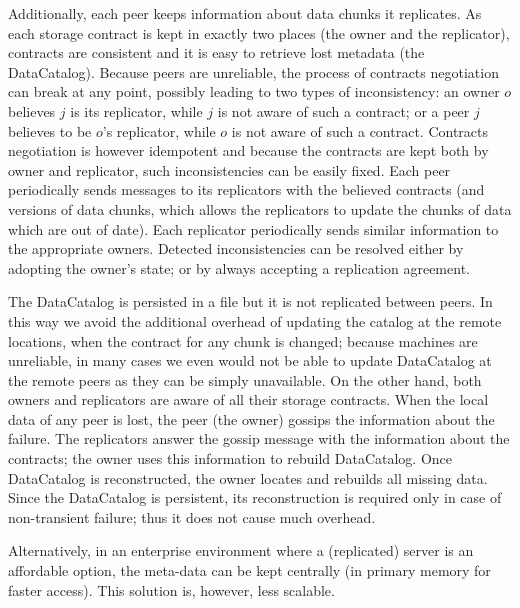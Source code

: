 \documentclass[10pt, final, conference, letterpaper]{IEEEtran}
\begin{document}
Additionally, each peer keeps information about data chunks it replicates. 
As each storage contract is kept in exactly two places (the owner and the replicator), contracts are consistent and it is easy to retrieve lost metadata (the DataCatalog). 
Because peers are unreliable, the process of contracts negotiation can break at any point, possibly leading to two types of inconsistency: an owner $o$ believes $j$ is its replicator, while $j$ is not aware of such a contract; or a peer $j$ believes to be $o$'s replicator, while $o$ is not aware of such a contract. Contracts negotiation is however idempotent and because the contracts are kept both by owner and replicator, such inconsistencies can be easily fixed. Each peer periodically sends messages to its replicators with the believed contracts (and versions of data chunks, which allows the replicators to update the chunks of data which are out of date). Each replicator periodically sends similar information to the appropriate owners. Detected inconsistencies can be resolved either by adopting the owner's state; or by always accepting a replication agreement.

The DataCatalog is persisted in a file but it is not replicated between peers. In this way we avoid the additional overhead of updating the catalog at the remote locations, when the contract for any chunk is changed; because machines are unreliable, in many cases we even would not be able to update DataCatalog at the remote peers as they can be simply unavailable. On the other hand, both owners and replicators are aware of all their storage contracts. When the local data of any peer is lost, the peer (the owner) gossips the information about the failure.  The replicators answer the gossip message with the information about the contracts; the owner uses this information to rebuild DataCatalog. Once DataCatalog is reconstructed, the owner locates and rebuilds all missing data. Since the DataCatalog is persistent, its reconstruction is required only in case of non-transient failure; thus it does not cause much overhead.

Alternatively, in an enterprise environment where a (replicated) server is an affordable option, the meta-data can be kept centrally (in primary memory for faster access). This solution is, however, less scalable.
\end{document}

